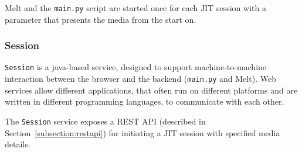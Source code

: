 \documentclass[12pt,a4paper]{article}
\begin{document}
Melt and the \texttt{main.py} script are started once for each JIT session with a parameter that presents the media from the start on.


\subsubsection{Session}

\texttt{Session} is a java-based service, designed to support machine-to-machine interaction between the browser and the backend (\texttt{main.py} and Melt). Web services allow different applications, that often run on different platforms and are written in different programming languages, to communicate with each other.~\cite{webservice}

The \texttt{Session} service exposes a REST API (described in Section~\ref{subsection:restapi}) for initiating a JIT session with specified media details. 






%
%
\end{document}
